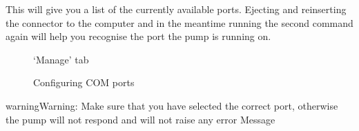 \documentclass[letterpaper,10pt,english]{sphinxmanual}
\begin{document}
This will give  you a list of the currently available ports. Ejecting and reinserting the connector
to the computer and in the meantime running the second command again will help you recognise
the port the pump is running on.
\begin{figure}[htbp]
\centering
\capstart

\caption{`Manage' tab}\label{installation:finding-manage}\end{figure}
\begin{figure}[htbp]
\centering
\capstart

\caption{Configuring COM ports}\label{installation:finding-com-ports}\end{figure}

\begin{notice}{warning}{Warning:}
Make sure that you have selected the correct port, otherwise the pump will not respond and will
not raise any error Message
\end{notice}
\end{document}
